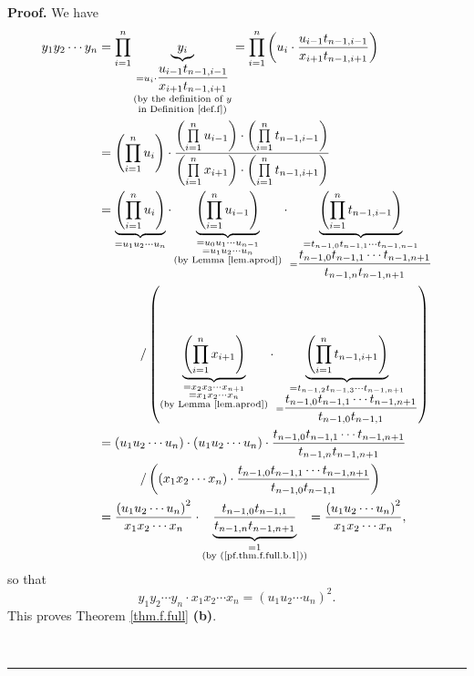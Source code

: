 \documentclass[numbers=enddot,12pt,final,onecolumn,notitlepage]{scrartcl}%
\theoremstyle{definition}
\newenvironment{proof}[1][Proof]{\noindent\textbf{#1.} }{\ \rule{0.5em}{0.5em}}
\let\prodnonlimits\prod
\renewcommand{\prod}{\prodnonlimits\limits}
\begin{document}
\begin{proof}
We have%
\begin{align*}
y_{1}y_{2}\cdots y_{n}  &  =\prod_{i=1}^{n}\underbrace{y_{i}}%
_{\substack{=u_{i}\cdot\dfrac{u_{i-1}t_{n-1,i-1}}{x_{i+1}t_{n-1,i+1}%
}\\\text{(by the definition of }y\\\text{in Definition \ref{def.f})}}%
}=\prod_{i=1}^{n}\left(  u_{i}\cdot\dfrac{u_{i-1}t_{n-1,i-1}}{x_{i+1}%
t_{n-1,i+1}}\right) \\
&  =\left(  \prod_{i=1}^{n}u_{i}\right)  \cdot\dfrac{\left(  \prod_{i=1}%
^{n}u_{i-1}\right)  \cdot\left(  \prod_{i=1}^{n}t_{n-1,i-1}\right)  }{\left(
\prod_{i=1}^{n}x_{i+1}\right)  \cdot\left(  \prod_{i=1}^{n}t_{n-1,i+1}\right)
}\\
&  =\underbrace{\left(  \prod_{i=1}^{n}u_{i}\right)  }_{=u_{1}u_{2}\cdots
u_{n}}\cdot\underbrace{\left(  \prod_{i=1}^{n}u_{i-1}\right)  }%
_{\substack{=u_{0}u_{1}\cdots u_{n-1}\\=u_{1}u_{2}\cdots u_{n}\\\text{(by
Lemma \ref{lem.aprod})}}}\cdot\underbrace{\left(  \prod_{i=1}^{n}%
t_{n-1,i-1}\right)  }_{\substack{=t_{n-1,0}t_{n-1,1}\cdots t_{n-1,n-1}%
\\=\dfrac{t_{n-1,0}t_{n-1,1}\cdots t_{n-1,n+1}}{t_{n-1,n}t_{n-1,n+1}}}}\\
&  \ \ \ \ \ \ \ \ \ \ /\left(  \underbrace{\left(  \prod_{i=1}^{n}%
x_{i+1}\right)  }_{\substack{=x_{2}x_{3}\cdots x_{n+1}\\=x_{1}x_{2}\cdots
x_{n}\\\text{(by Lemma \ref{lem.aprod})}}}\cdot\underbrace{\left(  \prod
_{i=1}^{n}t_{n-1,i+1}\right)  }_{\substack{=t_{n-1,2}t_{n-1,3}\cdots
t_{n-1,n+1}\\=\dfrac{t_{n-1,0}t_{n-1,1}\cdots t_{n-1,n+1}}{t_{n-1,0}t_{n-1,1}%
}}}\right) \\
&  =\left(  u_{1}u_{2}\cdots u_{n}\right)  \cdot\left(  u_{1}u_{2}\cdots
u_{n}\right)  \cdot\dfrac{t_{n-1,0}t_{n-1,1}\cdots t_{n-1,n+1}}{t_{n-1,n}%
t_{n-1,n+1}}\\
&  \ \ \ \ \ \ \ \ \ \ /\left(  \left(  x_{1}x_{2}\cdots x_{n}\right)
\cdot\dfrac{t_{n-1,0}t_{n-1,1}\cdots t_{n-1,n+1}}{t_{n-1,0}t_{n-1,1}}\right)
\\
&  =\dfrac{\left(  u_{1}u_{2}\cdots u_{n}\right)  ^{2}}{x_{1}x_{2}\cdots
x_{n}}\cdot\underbrace{\dfrac{t_{n-1,0}t_{n-1,1}}{t_{n-1,n}t_{n-1,n+1}}%
}_{\substack{=1\\\text{(by (\ref{pf.thm.f.full.b.1}))}}}=\dfrac{\left(
u_{1}u_{2}\cdots u_{n}\right)  ^{2}}{x_{1}x_{2}\cdots x_{n}},
\end{align*}
so that%
\[
y_{1}y_{2}\cdots y_{n}\cdot x_{1}x_{2}\cdots x_{n}=\left(  u_{1}u_{2}\cdots
u_{n}\right)  ^{2}.
\]
This proves Theorem \ref{thm.f.full} \textbf{(b)}.


\end{proof}
\end{document}
